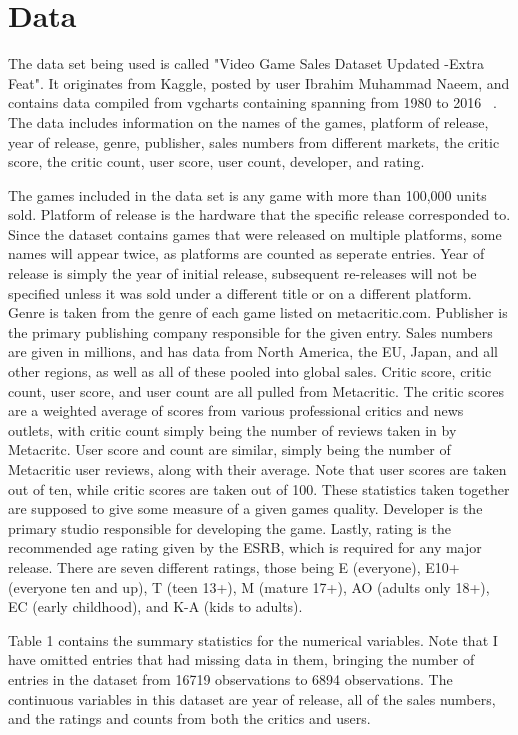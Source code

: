 \documentclass[12pt]{article}
\begin{document}
\section{Data}
\label{sec:data}
The data set being used is called "Video Game Sales Dataset Updated -Extra Feat". It originates from Kaggle, posted by user 
Ibrahim Muhammad Naeem, and contains data compiled from vgcharts containing spanning from 1980 to 2016 ~\citep[(D)][]{maindataset}. 
The data includes information on the names of the games, platform of release, year of  release, genre, publisher, sales numbers 
from different markets, the critic score, the critic count, user score, user count, developer, and rating.

The games included in the data set is any game with more than 100,000 units sold. Platform of release is the hardware that the specific release corresponded to. 
Since the dataset contains games that were released on multiple platforms, some names will appear twice, as platforms are counted as seperate entries.
Year of release is simply the year of initial release, subsequent re-releases will not be specified unless 
it was sold under a different title or on a different platform. Genre is taken from the genre of each game listed on metacritic.com. 
Publisher is the primary publishing company responsible for the given entry. Sales numbers are given in millions, and has data from North 
America, the EU, Japan, and all other regions, as well as all of these pooled into global sales. Critic score, critic count, user score, and user count are 
all pulled from Metacritic. The critic scores are a weighted average of scores from various professional critics and news outlets, with 
critic count simply being the number of reviews taken in by Metacritc. User score and count are similar, simply being the number of 
Metacritic user reviews, along with their average. Note that user scores are taken out of ten, while critic scores are taken out of 100. These statistics taken together are supposed to give some measure of a given games 
quality. Developer is the primary studio responsible for developing the game. Lastly, rating is the recommended age rating given by 
the ESRB, which is required for any major release. There are seven different ratings, those being E (everyone), E10+ (everyone ten and up), 
T (teen 13+), M (mature 17+), AO (adults only 18+), EC (early childhood), and K-A (kids to adults).

Table 1 contains the summary statistics for the numerical variables. Note that I have omitted entries that had missing data in them, bringing the number of 
entries in the dataset from 16719 observations to 6894 observations. The continuous variables in this dataset are year of release, all of the sales 
numbers, and the ratings and counts from both the critics and users.
\end{document}

